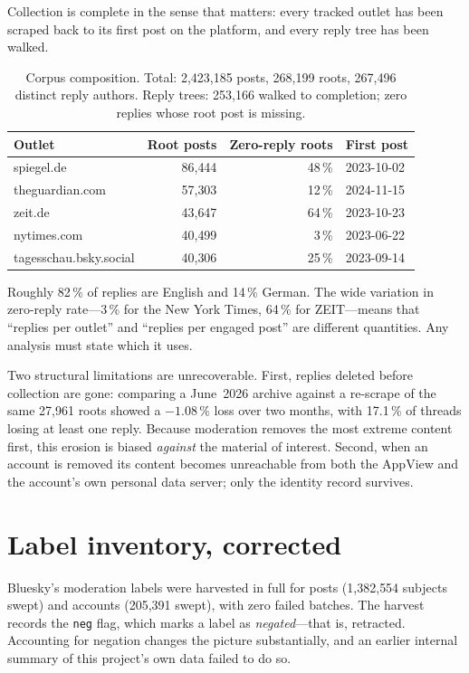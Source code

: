 \documentclass[11pt,a4paper]{article}
\begin{document}
Collection is complete in the sense that matters: every tracked outlet has been
scraped back to its first post on the platform, and every reply tree has been walked.

\begin{table}[h]
\centering
\begin{tabular}{lrrl}
\toprule
Outlet & Root posts & Zero-reply roots & First post \\
\midrule
spiegel.de              & 86{,}444 & 48\,\% & 2023-10-02 \\
theguardian.com         & 57{,}303 & 12\,\% & 2024-11-15 \\
zeit.de                 & 43{,}647 & 64\,\% & 2023-10-23 \\
nytimes.com             & 40{,}499 &  3\,\% & 2023-06-22 \\
tagesschau.bsky.social  & 40{,}306 & 25\,\% & 2023-09-14 \\
\bottomrule
\end{tabular}
\caption{Corpus composition. Total: 2{,}423{,}185 posts, 268{,}199 roots,
267{,}496 distinct reply authors. Reply trees: 253{,}166 walked to completion; zero
replies whose root post is missing.}
\end{table}

Roughly 82\,\% of replies are English and 14\,\% German. The wide variation in
zero-reply rate---3\,\% for the New York Times, 64\,\% for ZEIT---means that
``replies per outlet'' and ``replies per engaged post'' are different quantities.
Any analysis must state which it uses.

Two structural limitations are unrecoverable. First, replies deleted before
collection are gone: comparing a June~2026 archive against a re-scrape of the same
27{,}961 roots showed a $-1.08\,\%$ loss over two months, with 17.1\,\% of threads
losing at least one reply. Because moderation removes the most extreme content
first, this erosion is biased \emph{against} the material of interest. Second, when
an account is removed its content becomes unreachable from both the AppView and the
account's own personal data server; only the identity record survives.

\section{Label inventory, corrected}
\label{sec:labels}

Bluesky's moderation labels were harvested in full for posts (1{,}382{,}554
subjects swept) and accounts (205{,}391 swept), with zero failed batches. The
harvest records the \texttt{neg} flag, which marks a label as \emph{negated}---that
is, retracted. Accounting for negation changes the picture substantially, and an
earlier internal summary of this project's own data failed to do so.
\end{document}
